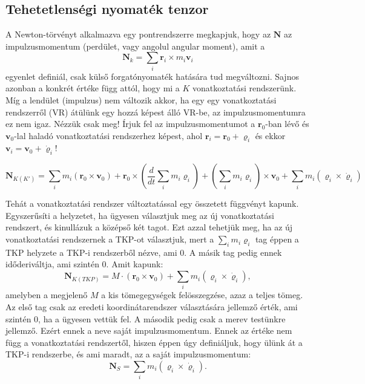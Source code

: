 \documentclass[12pt,a4paper]{scrartcl}
\let\mathbf\bm
\begin{document}
\subsection{Tehetetlenségi nyomaték tenzor}
A Newton-törvényt alkalmazva egy pontrendszerre megkapjuk, hogy az ${\mathbf{N}}$ az impulzusmomentum (perdület, vagy angolul angular moment), amit a 
\begin{equation}
{\mathbf{N}_k} = \sum\limits_i {{{\mathbf{r}}_i} \times {m_i}{{\mathbf{v}}_i}} 
\end{equation}
egyenlet definiál, csak külső forgatónyomaték hatására tud megváltozni. Sajnos azonban a konkrét értéke függ attól, hogy mi a $K$ vonatkoztatási rendszerünk. Míg a lendület (impulzus) nem változik akkor, ha egy egy vonatkoztatási rendszerről (VR) átülünk egy hozzá képest álló VR-be, az impulzusmomentumra ez nem igaz. Nézzük csak meg! Írjuk fel az impulzusmomentumot a ${{\mathbf{r}}_0}$-ban lévő és ${{\mathbf{v}}_0}$-lal haladó vonatkoztatási rendszerhez képest, ahol ${{\mathbf{r}}_i} = {{\mathbf{r}}_0} + {{\mathbf{\varrho }}_i}$ és ekkor ${{\mathbf{v}}_i} = {{\mathbf{v}}_0} + {{\mathbf{\dot \varrho }}_i}$!

\[{{\mathbf{N}}_{K\left( {K'} \right)}} = \sum\limits_i {{m_i}\left( {{{\mathbf{r}}_0} \times {{\mathbf{v}}_0}} \right)}  + {{\mathbf{r}}_0} \times \left( {\frac{d}{{dt}}\sum\limits_i {{m_i}{{\mathbf{\varrho }}_i}} } \right) + \left( {\sum\limits_i {{m_i}{{\mathbf{\varrho }}_i}} } \right) \times {{\mathbf{v}}_0} + \sum\limits_i {{m_i}\left( {{{\mathbf{\varrho }}_i} \times {{{\mathbf{\dot \varrho }}}_i}} \right)} \]

Tehát a vonatkoztatási rendszer változtatással egy összetett függvényt kapunk. Egyszerűsíti a helyzetet, ha ügyesen választjuk meg az új vonatkoztatási rendszert, és kinullázuk a középső két tagot. Ezt azzal tehetjük meg, ha az új vonatkoztatási rendszernek a TKP-ot választjuk, mert a ${\sum\limits_i {{m_i}{{\mathbf{\varrho }}_i}} }$ tag éppen a TKP helyzete a TKP-i rendszerből nézve, ami 0. A másik tag pedig ennek időderiváltja, ami szintén 0. Amit kapunk:
\[{{\mathbf{N}}_{K\left( {TKP} \right)}} = M \cdot \left( {{{\mathbf{r}}_0} \times {{\mathbf{v}}_0}} \right) + \sum\limits_i {{m_i}\left( {{{\mathbf{\varrho }}_i} \times {{{\mathbf{\dot \varrho }}}_i}} \right)}, \]
amelyben a megjelenő $M$ a kis tömegegységek felösszegzése, azaz a teljes tömeg. Az első tag csak az eredeti koordinátarendszer választására jellemző érték, ami szintén 0, ha a ügyesen vettük fel. A második pedig csak a merev testünkre jellemző. Ezért ennek a neve saját impulzusmomentum. Ennek az értéke nem függ a vonatkoztatási rendszertől, hiszen éppen úgy definiáljuk, hogy ülünk át a TKP-i rendszerbe, és ami maradt, az a saját impulzusmomentum:
\[{{\mathbf{N}}_S} = \sum\limits_i {{m_i}\left( {{{\mathbf{\varrho }}_i} \times {{{\mathbf{\dot \varrho }}}_i}} \right)} .\]
\end{document}
